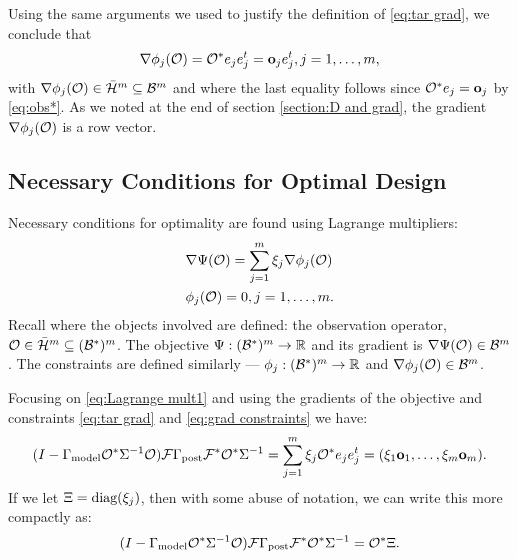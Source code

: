 \documentclass{amsart}
\numberwithin{equation}{section}
\begin{document}
Using the same arguments we used to justify the definition of
\eqref{eq:tar grad}, we conclude that
\begin{align}\label{eq:grad constraints}
\nabla \phi_j(\mathcal{O}) = \mathcal{O}^* e_j e_j^t = \mathbf{o}_j e_j^t , j=1,\dots,m,
\end{align}
with $\nabla \phi_j(\mathcal{O}) \in \bar{\mathcal{H}}^m \subseteq \mathcal{B}^m$ and where the
last equality follows since $\mathcal{O}^*e_j = \mathbf{o}_j$ by \eqref{eq:obs*}. As
we noted at the end of section \ref{section:D and grad}, the
gradient $\nabla \phi_j(\mathcal{O})$ is a row vector.

\subsection{Necessary Conditions for Optimal Design}\label{subsec:necessary}
Necessary conditions for optimality are found using Lagrange
multipliers:
\begin{align}
  &\nabla \Psi(\mathcal{O}) = \sum_{j=1}^m \xi_j \nabla \phi_j (\mathcal{O})
  \label{eq:Lagrange mult1} \\
    &\phi_j(\mathcal{O}) = 0, j = 1,\dots,m. \label{eq:Lagrange mult2}
\end{align}
Recall where the objects involved are defined: the observation operator,
$\mathcal{O} \in \bar{\mathcal{H}}^m \subseteq (\mathcal{B}^*)^m$. The objective $\Psi:
(\mathcal{B}^*)^m \to \mathbb{R}$ and its gradient is $\nabla \Psi(\mathcal{O}) \in
\mathcal{B}^m$. The constraints are defined similarly --- $\phi_j: (\mathcal{B}^*)^m
\to \mathbb{R}$ and $\nabla \phi_j(\mathcal{O}) \in \mathcal{B}^m$.

Focusing on \eqref{eq:Lagrange mult1} and using the gradients of the
objective and constraints \eqref{eq:tar grad} and \eqref{eq:grad
  constraints} we have:
\begin{equation*}
  (I - \Gamma_{\textup{model}} \mathcal{O}^* \Sigma^{-1} \mathcal{O}) \mathcal{F} \Gamma_{\textup{post}} \mathcal{F}^* \mathcal{O}^*\Sigma^{-1}
  = \sum_{j=1}^m \xi_j \mathcal{O}^* e_je_j^t = (\xi_1 \mathbf{o}_1,\dots,\xi_m \mathbf{o}_m).
\end{equation*}
If we let $\Xi = \textup{diag}(\xi_j)$, then with some abuse of
notation, we can write this more compactly as:
\begin{equation}\label{eq:conditions}
  ( I - \Gamma_{\textup{model}} \mathcal{O}^* \Sigma^{-1} \mathcal{O}) \mathcal{F} \Gamma_{\textup{post}} \mathcal{F}^* \mathcal{O}^*  \Sigma^{-1}
  = \mathcal{O}^* \Xi.
\end{equation}
\end{document}
